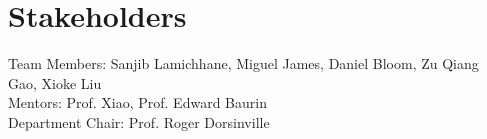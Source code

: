 \section{Stakeholders}
Team Members: Sanjib Lamichhane, Miguel James, Daniel Bloom, Zu Qiang Gao, Xioke Liu \\
Mentors: Prof. Xiao, Prof. Edward Baurin \\
Department Chair: Prof. Roger Dorsinville \\